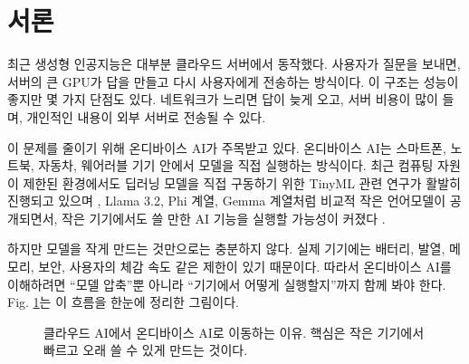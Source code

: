 \documentclass[twocolumn,10pt]{article}
\begin{document}
\section{서론}
최근 생성형 인공지능은 대부분 클라우드 서버에서 동작했다. 사용자가 질문을 보내면, 서버의 큰 GPU가 답을 만들고 다시 사용자에게 전송하는 방식이다. 이 구조는 성능이 좋지만 몇 가지 단점도 있다. 네트워크가 느리면 답이 늦게 오고, 서버 비용이 많이 들며, 개인적인 내용이 외부 서버로 전송될 수 있다.

이 문제를 줄이기 위해 온디바이스 AI가 주목받고 있다. 온디바이스 AI는 스마트폰, 노트북, 자동차, 웨어러블 기기 안에서 모델을 직접 실행하는 방식이다. 최근 컴퓨팅 자원이 제한된 환경에서도 딥러닝 모델을 직접 구동하기 위한 TinyML 관련 연구가 활발히 진행되고 있으며 \cite{lim2024tinyml}, Llama 3.2, Phi 계열, Gemma 계열처럼 비교적 작은 언어모델이 공개되면서, 작은 기기에서도 쓸 만한 AI 기능을 실행할 가능성이 커졌다 \cite{llama32_2024,phi4_2025,gemma3_2025}.

하지만 모델을 작게 만드는 것만으로는 충분하지 않다. 실제 기기에는 배터리, 발열, 메모리, 보안, 사용자의 체감 속도 같은 제한이 있기 때문이다. 따라서 온디바이스 AI를 이해하려면 ``모델 압축''뿐 아니라 ``기기에서 어떻게 실행할지''까지 함께 봐야 한다. Fig. \ref{fig:ko_bigpicture}는 이 흐름을 한눈에 정리한 그림이다.

\begin{figure}[H]
\centering
{}
\caption{클라우드 AI에서 온디바이스 AI로 이동하는 이유. 핵심은 작은 기기에서 빠르고 오래 쓸 수 있게 만드는 것이다.}
\label{fig:ko_bigpicture}
\end{figure}
\end{document}
